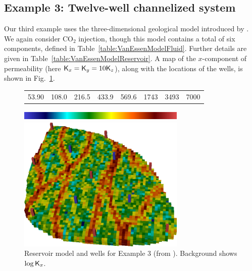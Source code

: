 \documentclass[twocolumn,numbook]{svjour3}          %
\begin{document}
\subsection{Example 3: Twelve-well channelized system}


Our third example uses the three-dimensional geological model introduced by
\cite{VanEssen}. We again consider CO$_2$ injection, though this model
contains a total of six components, defined in
Table~\ref{table:VanEssenModelFluid}. Further details are given in Table~\ref{table:VanEssenModelReservoir}.  A map of
the $x$-component of permeability (here $\mathsf{K}_x = \mathsf{K}_y = 10\mathsf{K}_z$), along with the
locations of the wells, is shown in Fig.~\ref{fig:VanEssenModelPermeabilityAndWells}.


\begin{figure}[ht]
     \begin{center}
      \begin{tabular}{cccccccc}
      53.90 & 108.0 & 216.5 & 433.9 & 569.6 & 1743 & 3493 & 7000 
      \end{tabular}
       \includegraphics[width=8cm,height=0.5cm]{VanEssenModelPermeabilityMapColorBar.png}
                                                            
       \medskip
       
       \includegraphics[width=8cm]{VanEssenModelPermeabilityMapConstant.png}%
     \end{center}
     \caption{Reservoir model and wells for Example 3 (from \cite{VanEssen}). Background shows $\log \mathsf{K}_x$.}
  \label{fig:VanEssenModelPermeabilityAndWells}
\end{figure}
\end{document}
